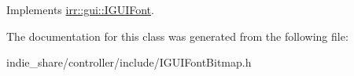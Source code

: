 Implements \hyperlink{classirr_1_1gui_1_1IGUIFont_a7de0b25d3d1dbdcc9036e5d788e2d9ab}{irr\+::gui\+::\+I\+G\+U\+I\+Font}.



The documentation for this class was generated from the following file\+:\begin{DoxyCompactItemize}
\item 
indie\+\_\+share/controller/include/I\+G\+U\+I\+Font\+Bitmap.\+h\end{DoxyCompactItemize}
